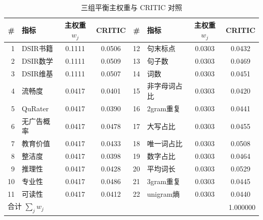 \begin{table}[!htbp]
  \centering
  \caption{三组平衡主权重与 CRITIC 对照}
  \label{tab:q1_weights}
  \songti{}
  \setlength{\tabcolsep}{4pt}
  \begin{tabular}{rlcc@{\hspace{1em}}rlcc}
    \toprule
    \# & 指标 & 主权重 $w_j$ & CRITIC & \# & 指标 & 主权重 $w_j$ & CRITIC \\
    \midrule
    1 & DSIR书籍 & 0.1111 & 0.0506 & 12 & 句末标点 & 0.0303 & 0.0432 \\
    2 & DSIR数学 & 0.1111 & 0.0509 & 13 & 句子数 & 0.0303 & 0.0469 \\
    3 & DSIR维基 & 0.1111 & 0.0507 & 14 & 词数 & 0.0303 & 0.0451 \\
    4 & 流畅度 & 0.0417 & 0.0401 & 15 & 非字母词占比 & 0.0303 & 0.0420 \\
    5 & QuRater & 0.0417 & 0.0390 & 16 & 2gram重复 & 0.0303 & 0.0441 \\
    6 & 无广告概率 & 0.0417 & 0.0478 & 17 & 大写占比 & 0.0303 & 0.0455 \\
    7 & 教育价值 & 0.0417 & 0.0433 & 18 & 唯一词占比 & 0.0303 & 0.0508 \\
    8 & 整洁度 & 0.0417 & 0.0398 & 19 & 数字占比 & 0.0303 & 0.0464 \\
    9 & 推理性 & 0.0417 & 0.0428 & 20 & 平均词长 & 0.0303 & 0.0529 \\
    10 & 专业性 & 0.0417 & 0.0486 & 21 & 3gram重复 & 0.0303 & 0.0445 \\
    11 & 可读性 & 0.0417 & 0.0412 & 22 & unigram熵 & 0.0303 & 0.0440 \\
    \midrule
    \multicolumn{4}{l}{合计 $\sum_j w_j$} & \multicolumn{4}{r}{1.000000} \\
    \bottomrule
  \end{tabular}
\end{table}
